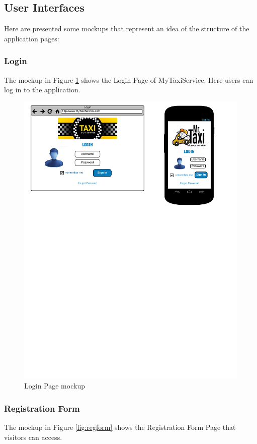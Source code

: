 \subsection{User Interfaces}
Here are presented some mockups that represent an idea of the structure of the application pages:

\subsubsection{Login}
The mockup in Figure \ref{fig:login} shows the Login Page of MyTaxiService. Here users can log in to the application.

\begin{figure}[htbp]
\centering
\includegraphics[width=\textwidth]{cpt/img/Login}
\caption{Login Page mockup}
\label{fig:login}
\end{figure}

\subsubsection{Registration Form}
The mockup in Figure \ref{fig:regform} shows the Registration Form Page that visitors can access.

